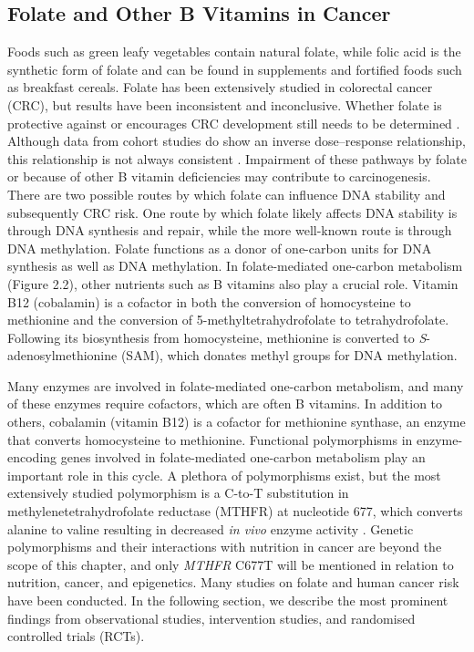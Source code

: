 \subsection{Folate and Other B Vitamins in Cancer} %
Foods such as green leafy vegetables contain natural folate, while folic acid is the synthetic form of folate and can be found in supplements and fortified foods such as breakfast cereals. Folate has been extensively studied in colorectal cancer (CRC), but results have been inconsistent and inconclusive. Whether folate is protective against or encourages CRC development still needs to be determined \cite{c227}. Although data from cohort studies do show an inverse dose--response relationship, this relationship is not always consistent \cite{c214}. Impairment of these pathways by folate or because of other B vitamin deficiencies may contribute to carcinogenesis. There are two possible routes by which folate can influence DNA stability and subsequently CRC risk. One route by which folate likely affects DNA stability is through DNA synthesis and repair, while the more well-known route is through DNA methylation. Folate functions as a donor of one-carbon units for DNA synthesis as well as DNA methylation. In 
folate-mediated one-carbon metabolism (Figure 2.2), other nutrients such as B vitamins also play a crucial role. Vitamin B12 (cobalamin) is a cofactor in both the conversion of homocysteine to methionine and the conversion of 5-methyltetrahydrofolate to tetrahydrofolate. Following its biosynthesis from homocysteine, methionine is converted to \emph{S}-adenosylmethionine (SAM), which donates methyl groups for DNA methylation. 
 
\noindent Many enzymes are involved in folate-mediated one-carbon metabolism, and many of these enzymes require cofactors, which are often B vitamins. In addition to others, cobalamin (vitamin B12) is a cofactor for methionine synthase, an enzyme that converts homocysteine to methionine. Functional polymorphisms in enzyme-encoding genes involved in folate-mediated one-carbon metabolism play an important role in this cycle. A plethora of polymorphisms exist, but the most extensively studied polymorphism is a C-to-T substitution in methylenetetrahydrofolate reductase (MTHFR) at nucleotide 677, which converts alanine to valine resulting in decreased \emph{in vivo} enzyme activity \cite{c228}. Genetic polymorphisms and their interactions with nutrition in cancer are beyond the scope of this chapter, and only \emph{MTHFR} C677T will be mentioned in relation to nutrition, cancer, and epigenetics. Many studies on folate and human cancer risk have been conducted. In the following section, we describe the most 
prominent findings from observational studies, intervention studies, and randomised controlled trials (RCTs). 
 
